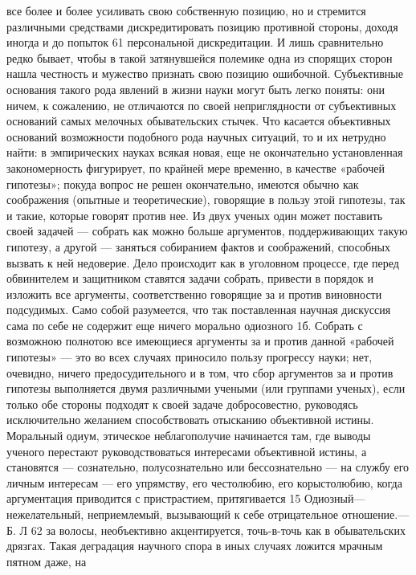 \documentclass[12pt, a4paper, openany]{book}
\begin{document}
все более и более усиливать свою собственную позицию, 
но и стремится различными средствами дискредитировать 
позицию противной стороны, доходя иногда и до попыток 
61 
персональной дискредитации. И лишь сравнительно редко 
бывает, чтобы в такой затянувшейся полемике одна из 
спорящих сторон нашла честность и мужество признать 
свою позицию ошибочной. 
Субъективные основания такого рода явлений в жизни 
науки могут быть легко поняты: они ничем, к сожалению, 
не отличаются по своей неприглядности от субъективных 
оснований самых мелочных обывательских стычек. Что 
касается объективных оснований возможности подобного 
рода научных ситуаций, то и их нетрудно найти: в  
эмпирических науках всякая новая, еще не окончательно  
установленная закономерность фигурирует, по крайней мере 
временно, в качестве «рабочей гипотезы»; покуда вопрос 
не решен окончательно, имеются обычно как соображения 
(опытные и теоретические), говорящие в пользу этой  
гипотезы, так и такие, которые говорят против нее. Из двух 
ученых один может поставить своей задачей — собрать 
как можно больше аргументов, поддерживающих такую 
гипотезу, а другой — заняться собиранием фактов и  
соображений, способных вызвать к ней недоверие. Дело  
происходит как в уголовном процессе, где перед обвинителем 
и защитником ставятся задачи собрать, привести в  
порядок и изложить все аргументы, соответственно говорящие 
за и против виновности подсудимых. 
Само собой разумеется, что так поставленная научная 
дискуссия сама по себе не содержит еще ничего морально 
одиозного 1б. Собрать с возможною полнотою все  
имеющиеся аргументы за и против данной «рабочей гипотезы» — 
это во всех случаях приносило пользу прогрессу науки; 
нет, очевидно, ничего предосудительного и в том, что сбор 
аргументов за и против гипотезы выполняется двумя  
различными учеными (или группами ученых), если только 
обе стороны подходят к своей задаче добросовестно,  
руководясь исключительно желанием способствовать  
отысканию объективной истины. Моральный одиум, этическое 
неблагополучие начинается там, где выводы ученого  
перестают руководствоваться интересами объективной истины, 
а становятся — сознательно, полусознательно или  
бессознательно — на службу его личным интересам — его 
упрямству, его честолюбию, его корыстолюбию, когда 
аргументация приводится с пристрастием, притягивается 
15 Одиозный— нежелательный, неприемлемый, вызывающий 
к себе отрицательное отношение.— Б. Л 
62 
за волосы, необъективно акцентируется, точь-в-точь как 
в обывательских дрязгах. Такая деградация научного 
спора в иных случаях ложится мрачным пятном даже, на 
\end{document}
